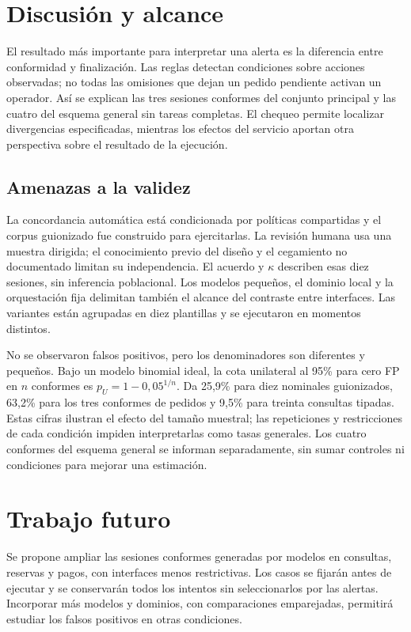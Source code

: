 \documentclass[conference]{IEEEtran}
\begin{document}
\section{Discusión y alcance}
El resultado más importante para interpretar una alerta es la diferencia entre conformidad y finalización. Las reglas detectan condiciones sobre acciones observadas; no todas las omisiones que dejan un pedido pendiente activan un operador. Así se explican las tres sesiones conformes del conjunto principal y las cuatro del esquema general sin tareas completas. El chequeo permite localizar divergencias especificadas, mientras los efectos del servicio aportan otra perspectiva sobre el resultado de la ejecución.

\subsection{Amenazas a la validez}
La concordancia automática está condicionada por políticas compartidas y el corpus guionizado fue construido para ejercitarlas. La revisión humana usa una muestra dirigida; el conocimiento previo del diseño y el cegamiento no documentado limitan su independencia. El acuerdo y \(\kappa\) describen esas diez sesiones, sin inferencia poblacional. Los modelos pequeños, el dominio local y la orquestación fija delimitan también el alcance del contraste entre interfaces. Las variantes están agrupadas en diez plantillas y se ejecutaron en momentos distintos.

No se observaron falsos positivos, pero los denominadores son diferentes y pequeños. Bajo un modelo binomial ideal, la cota unilateral al 95\% para cero FP en \(n\) conformes es \(p_U=1-0{,}05^{1/n}\). Da 25,9\% para diez nominales guionizados, 63,2\% para los tres conformes de pedidos y 9,5\% para treinta consultas tipadas. Estas cifras ilustran el efecto del tamaño muestral; las repeticiones y restricciones de cada condición impiden interpretarlas como tasas generales. Los cuatro conformes del esquema general se informan separadamente, sin sumar controles ni condiciones para mejorar una estimación.

\section{Trabajo futuro}
Se propone ampliar las sesiones conformes generadas por modelos en consultas, reservas y pagos, con interfaces menos restrictivas. Los casos se fijarán antes de ejecutar y se conservarán todos los intentos sin seleccionarlos por las alertas. Incorporar más modelos y dominios, con comparaciones emparejadas, permitirá estudiar los falsos positivos en otras condiciones.
\end{document}
